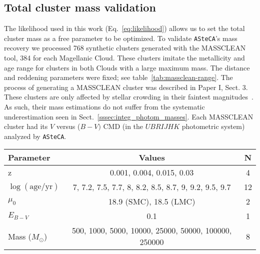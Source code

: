 \documentclass[draft]{aa}
\begin{document}
\begin{appendix}

\section{Total cluster mass validation}
\label{apdx:mass_valid}

The likelihood used in this work (Eq.~\ref{eq:likelihood}) allows
us to set the total cluster mass as a free parameter to be optimized.
To validate \texttt{ASteCA}'s mass recovery we processed 768 synthetic
clusters generated with the MASSCLEAN tool, 384 for each Magellanic Cloud.
%
These clusters imitate the metallicity and age range for clusters in
both Clouds with a large maximum mass. The distance and reddening parameters
were fixed; see table~\ref{tab:massclean-range}.
The process of generating a MASSCLEAN cluster was described in Paper I, Sect. 3.
These clusters are only affected by stellar crowding in their faintest
magnitudes~\citep[using a theoretical completeness function similar to that
presented in][]{Small_2013}. As such, their mass estimations do not suffer from
the systematic underestimation seen in Sect.~\ref{sssec:integ_photom_masses}.
%
Each MASSCLEAN cluster had its $V$ versus ($B-V)$ CMD (in the $UBRIJHK$
photometric system) analyzed by \texttt{ASteCA}.

\begin{table*}
\centering
\caption{Parameter values used to generate the set of 768 MASSCLEAN clusters.}
\label{tab:massclean-range}
\begin{tabular}{lcc}
\hline\hline
 Parameter & Values & N\\
\hline
z & 0.001, 0.004, 0.015, 0.03 & 4\\
$\log\mathrm{(age/yr)}$ & 7, 7.2, 7.5, 7.7, 8, 8.2, 8.5, 8.7, 9, 9.2, 9.5, 9.7 &
12\\
$\mu_0$ & 18.9 (SMC), 18.5 (LMC) & 2\\
$E_{B-V}$ & 0.1 & 1\\
Mass ($M_{\odot}$) & 500, 1000, 5000, 10000, 25000, 50000, 100000, 250000 & 8\\
\hline
\end{tabular}
\end{table*}


\end{appendix}
\end{document}
